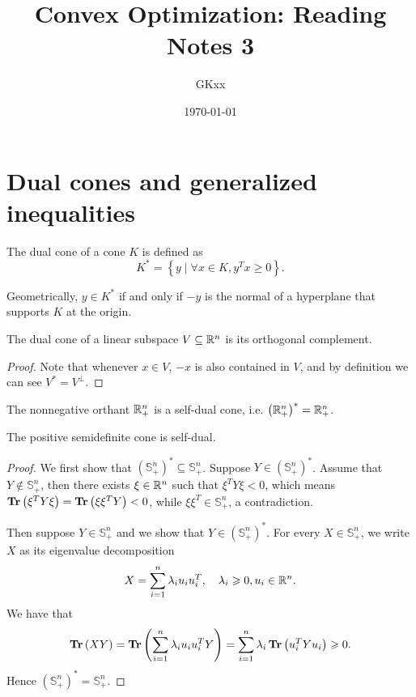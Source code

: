 \documentclass[12pt]{article}
\title{Convex Optimization: Reading Notes 3}
\author{GKxx}
\date{\today}
\begin{document}
\maketitle

\section{Dual cones and generalized inequalities}

\begin{definition}
    The \textnormal{dual cone} of a cone \(K\) is defined as
    \[K^\ast=\left\{y\mid\forall x\in K,y^Tx\geqslant 0\right\}.\]
\end{definition}

Geometrically, \(y\in K^\ast\) if and only if \(-y\) is the normal of a hyperplane that supports \(K\) at the origin.

\begin{proposition}
    The dual cone of a linear subspace \(V\subseteq\mathbb R^n\) is its orthogonal complement.
\end{proposition}
\begin{proof}
    Note that whenever \(x\in V\), \(-x\) is also contained in \(V\), and by definition we can see \(V^\ast=V^\perp\).
\end{proof}

\begin{proposition}
    The \textnormal{nonnegative orthant} \(\mathbb R_+^n\) is a self-dual cone, i.e. \(\left(\mathbb R_+^n\right)^\ast=\mathbb R_+^n\).
\end{proposition}

\begin{proposition}
    The \textnormal{positive semidefinite cone} is self-dual.
\end{proposition}
\begin{proof}
    We first show that \(\left(\mathbb S_+^n\right)^\ast\subseteq\mathbb S_+^n\). Suppose \(Y\in\left(\mathbb S_+^n\right)^\ast\). Assume that \(Y\notin\mathbb S_+^n\), then there exists \(\xi\in\mathbb R^n\) such that \(\xi^TY\xi<0\), which means \(\operatorname{\mathbf{Tr}}\left(\xi^TY\xi\right)=\operatorname{\mathbf{Tr}}\left(\xi\xi^TY\right)<0\), while \(\xi\xi^T\in\mathbb S_+^n\), a contradiction.\par
    Then suppose \(Y\in\mathbb S_+^n\) and we show that \(Y\in\left(\mathbb S_+^n\right)^\ast\). For every \(X\in\mathbb S_+^n\), we write \(X\) as its eigenvalue decomposition
    \[X=\sum_{i=1}^n\lambda_iu_iu_i^T,\quad\lambda_i\geqslant 0,u_i\in\mathbb R^n.\]
    We have that
    \[\operatorname{\mathbf{Tr}}\left(XY\right)=\operatorname{\mathbf{Tr}}\left(\sum_{i=1}^n\lambda_iu_iu_i^TY\right)=\sum_{i=1}^n\lambda_i\operatorname{\mathbf{Tr}}\left(u_i^TYu_i\right)\geqslant 0.\]
    Hence \(\left(\mathbb S_+^n\right)^\ast=\mathbb S_+^n\).
\end{proof}
\end{document}
